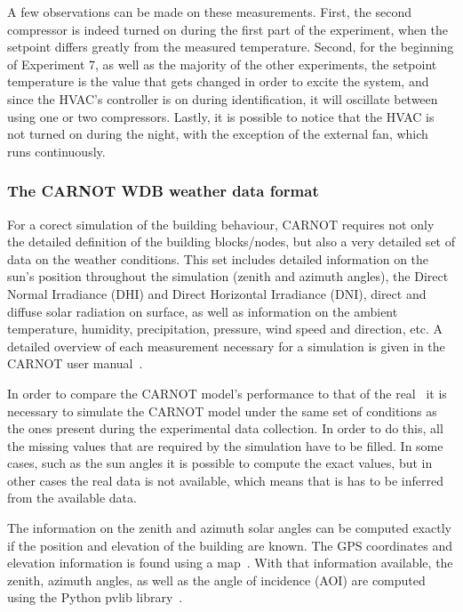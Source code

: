 A few observations can be made on these measurements. First, the second
compressor is indeed turned on during the first part of the experiment, when the
setpoint differs greatly from the measured temperature. Second, for the
beginning of Experiment 7, as well as the majority of the other experiments, the
setpoint temperature is the value that gets changed in order to excite the
system, and since the HVAC's controller is on during identification, it will
oscillate between using one or two compressors. Lastly, it is possible to notice
that the HVAC is not turned on during the night, with the exception of the
external fan, which runs continuously.

\subsubsection{The CARNOT WDB weather data format}\label{sec:CARNOT_WDB}

For a corect simulation of the building behaviour, CARNOT requires not only the
detailed definition of the building blocks/nodes, but also a very detailed set
of data on the weather conditions. This set includes detailed information on the
sun's position throughout the simulation (zenith and azimuth angles), the Direct
Normal Irradiance (DHI) and Direct Horizontal Irradiance (DNI), direct and
diffuse solar radiation on surface, as well as information on the ambient
temperature, humidity, precipitation, pressure, wind speed and direction, etc.
A detailed overview of each measurement necessary for a simulation is given in
the CARNOT user manual~\cite{CARNOTManual}.

In order to compare the CARNOT model's performance to that of the real \pdome\
it is necessary to simulate the CARNOT model under the same set of conditions as
the ones present during the experimental data collection. In order to do this,
all the missing values that are required by the simulation have to be filled. In
some cases, such as the sun angles it is possible to compute the exact values,
but in other cases the real data is not available, which means that is has to be
inferred from the available data.

The information on the zenith and azimuth solar angles can be computed exactly
if the position and elevation of the building are known. The GPS coordinates and
elevation information is found using a map~\cite{ElevationFinder}. With that
information available, the zenith, azimuth angles, as well as the angle of
incidence (AOI) are computed using the Python pvlib
library~\cite{f.holmgrenPvlibPythonPython2018}.

